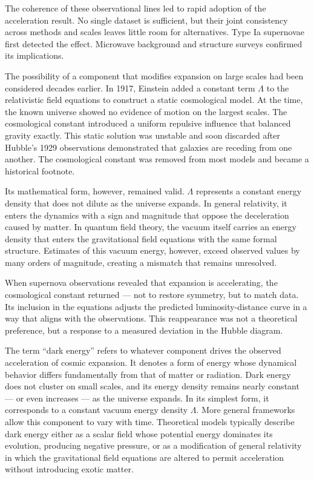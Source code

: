 The coherence of these observational lines led to rapid adoption of the acceleration result. No single dataset is sufficient, but their joint consistency across methods and scales leaves little room for alternatives. Type Ia supernovae first detected the effect. Microwave background and structure surveys confirmed its implications.

The possibility of a component that modifies expansion on large scales had been considered decades earlier. In 1917, Einstein added a constant term $\Lambda$ to the relativistic field equations to construct a static cosmological model. At the time, the known universe showed no evidence of motion on the largest scales. The cosmological constant introduced a uniform repulsive influence that balanced gravity exactly. This static solution was unstable and soon discarded after Hubble’s 1929 observations demonstrated that galaxies are receding from one another. The cosmological constant was removed from most models and became a historical footnote.

Its mathematical form, however, remained valid. $\Lambda$ represents a constant energy density that does not dilute as the universe expands. In general relativity, it enters the dynamics with a sign and magnitude that oppose the deceleration caused by matter. In quantum field theory, the vacuum itself carries an energy density that enters the gravitational field equations with the same formal structure. Estimates of this vacuum energy, however, exceed observed values by many orders of magnitude, creating a mismatch that remains unresolved.

When supernova observations revealed that expansion is accelerating, the cosmological constant returned — not to restore symmetry, but to match data. Its inclusion in the equations adjusts the predicted luminosity-distance curve in a way that aligns with the observations. This reappearance was not a theoretical preference, but a response to a measured deviation in the Hubble diagram.

The term “dark energy” refers to whatever component drives the observed acceleration of cosmic expansion. It denotes a form of energy whose dynamical behavior differs fundamentally from that of matter or radiation. Dark energy does not cluster on small scales, and its energy density remains nearly constant — or even increases — as the universe expands. In its simplest form, it corresponds to a constant vacuum energy density $\Lambda$. More general frameworks allow this component to vary with time. Theoretical models typically describe dark energy either as a scalar field whose potential energy dominates its evolution, producing negative pressure, or as a modification of general relativity in which the gravitational field equations are altered to permit acceleration without introducing exotic matter.

